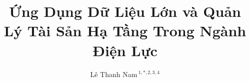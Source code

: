 \documentclass[utf8]{frontiersSCNS} %
\def\firstAuthorLast{22-03-2023} %
\def\Authors{Lê Thanh Nam\,$^{1,*, 2, 3, 4}$}
\begin{document}
\onecolumn
{}

\title[Ứng Dụng Dữ Liệu Lớn/Quản Lý Hạ Tầng - Điện Lực]{Ứng Dụng Dữ Liệu Lớn và Quản Lý Tài Sản Hạ Tầng Trong Ngành Điện Lực} 

\author[\firstAuthorLast ]{\Authors} %
\address{} %
\correspondance{} %

\extraAuth{}%


\maketitle
\end{document}
